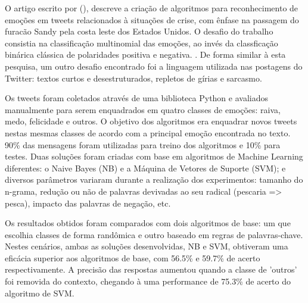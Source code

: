 \documentclass[
	12pt,				%
	openright,			%
	oneside,			%
	a4paper,			%
	english,			%
	spanish,			%
	brazil				%
	]{abntex2}
\begin{document}
O artigo escrito por \citeauthor{article_tweet_crisis} (\citeyear{article_tweet_crisis}), descreve a criação de algoritmos para reconhecimento de emoções em tweets relacionados à situações de crise, com ênfase na passagem do furacão Sandy pela costa leste dos Estados Unidos. O desafio do trabalho consistia na classificação multinomial das emoções, ao invés da classficação binárica clássica de polaridades positiva e negativa. \cite{article_sentiment_twitter}. De forma similar à esta pesquisa, um outro desafio encontrado foi a linguagem utilizada nas postagens do Twitter: textos curtos e desestruturados, repletos de gírias e sarcasmo.

Os tweets foram coletados através de uma biblioteca Python e avaliados manualmente para serem enquadrados em quatro classes de emoções: raiva, medo, felicidade e outros. O objetivo dos algoritmos era enquadrar novos tweets nestas mesmas classes de acordo com a principal emoção encontrada no texto. 90\% das mensagens foram utilizadas para treino dos algoritmos e 10\% para testes. Duas soluções foram criadas com base em algoritmos de Machine Learning diferentes: o Naive Bayes (NB) e a Máquina de Vetores de Suporte (SVM); e diversos parâmetros variaram durante a realização dos experimentos: tamanho do n-grama, redução ou não de palavras devivadas ao seu radical (pescaria => pesca), impacto das palavras de negação, etc. 

Os resultados obtidos foram comparados com dois algoritmos de base: um que escolhia classes de forma randômica e outro baseado em regras de palavras-chave. Nestes cenários, ambas as soluções desenvolvidas, NB e SVM, obtiveram uma eficácia superior aos algoritmos de base, com 56.5\% e 59.7\% de acerto respectivamente. A precisão das respostas aumentou quando a classe de 'outros' foi removida do contexto, chegando à uma performance de 75.3\% de acerto do algoritmo de SVM. 

	 
	

\postextual



	
\end{document}
